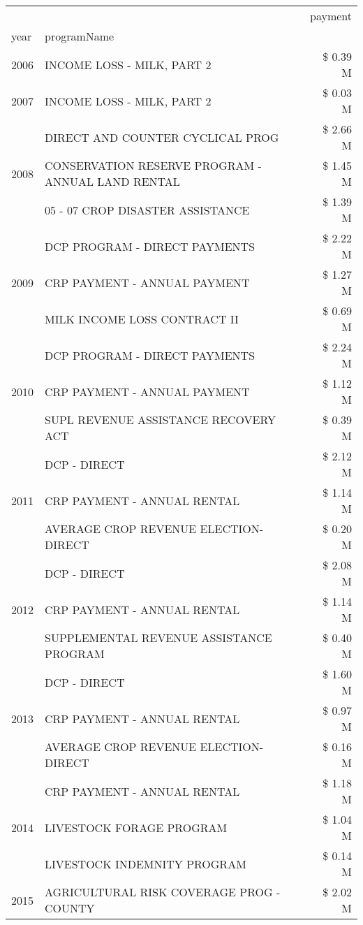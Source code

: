 \begin{tabular}{llr}
\toprule
 &  & payment \\
year & programName &  \\
\midrule
2006 & INCOME LOSS - MILK, PART 2 & \$ 0.39 M \\
\cline{1-3}
2007 & INCOME LOSS - MILK, PART 2 & \$ 0.03 M \\
\cline{1-3}
\multirow[t]{3}{*}{2008} & DIRECT AND COUNTER CYCLICAL PROG & \$ 2.66 M \\
 & CONSERVATION RESERVE PROGRAM - ANNUAL LAND RENTAL & \$ 1.45 M \\
 & 05 - 07 CROP DISASTER ASSISTANCE & \$ 1.39 M \\
\cline{1-3}
\multirow[t]{3}{*}{2009} & DCP PROGRAM - DIRECT PAYMENTS & \$ 2.22 M \\
 & CRP PAYMENT - ANNUAL PAYMENT & \$ 1.27 M \\
 & MILK INCOME LOSS CONTRACT II & \$ 0.69 M \\
\cline{1-3}
\multirow[t]{3}{*}{2010} & DCP PROGRAM - DIRECT PAYMENTS & \$ 2.24 M \\
 & CRP PAYMENT - ANNUAL PAYMENT & \$ 1.12 M \\
 & SUPL REVENUE ASSISTANCE RECOVERY ACT & \$ 0.39 M \\
\cline{1-3}
\multirow[t]{3}{*}{2011} & DCP - DIRECT & \$ 2.12 M \\
 & CRP PAYMENT - ANNUAL RENTAL & \$ 1.14 M \\
 & AVERAGE CROP REVENUE ELECTION-DIRECT & \$ 0.20 M \\
\cline{1-3}
\multirow[t]{3}{*}{2012} & DCP - DIRECT & \$ 2.08 M \\
 & CRP PAYMENT - ANNUAL RENTAL & \$ 1.14 M \\
 & SUPPLEMENTAL REVENUE ASSISTANCE PROGRAM & \$ 0.40 M \\
\cline{1-3}
\multirow[t]{3}{*}{2013} & DCP - DIRECT & \$ 1.60 M \\
 & CRP PAYMENT - ANNUAL RENTAL & \$ 0.97 M \\
 & AVERAGE CROP REVENUE ELECTION-DIRECT & \$ 0.16 M \\
\cline{1-3}
\multirow[t]{3}{*}{2014} & CRP PAYMENT - ANNUAL RENTAL & \$ 1.18 M \\
 & LIVESTOCK FORAGE PROGRAM & \$ 1.04 M \\
 & LIVESTOCK INDEMNITY PROGRAM & \$ 0.14 M \\
\cline{1-3}
\multirow[t]{3}{*}{2015} & AGRICULTURAL RISK COVERAGE PROG - COUNTY & \$ 2.02 M \\

\end{tabular}
